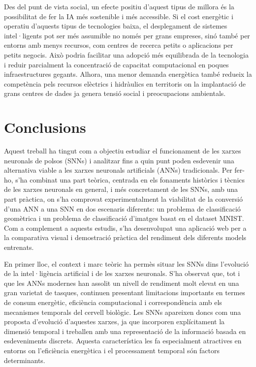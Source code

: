 \documentclass[a4paper,11pt, titlepage, twoside]{article}
\begin{document}
Des del punt de vista social, un efecte positiu d’aquest tipus de millora és la possibilitat de fer la IA més sostenible i més accessible. Si el cost energètic i operatiu d'aquests tipus de tecnologies baixa, el desplegament de sistemes intel·ligents pot ser més assumible no només per grans empreses, sinó també per entorns amb menys recursos, com centres de recerca petits o aplicacions per petits negocis. Això podria facilitar una adopció més equilibrada de la tecnologia i reduir parcialment la concentració de capacitat computacional en poques infraestructures gegants. Alhora, una menor demanda energètica també redueix la competència pels recursos elèctrics i hidràulics en territoris on la implantació de grans centres de dades ja genera tensió social i preocupacions ambientals.
\section{Conclusions}

Aquest treball ha tingut com a objectiu estudiar el funcionament de les xarxes neuronals de polsos (SNNs) i analitzar fins a quin punt poden esdevenir una alternativa viable a les xarxes neuronals artificials (ANNs) tradicionals. Per fer-ho, s'ha combinat una part teòrica, centrada en els fonaments històrics i tècnics de les xarxes neuronals en general, i més concretament de les SNNs, amb una part pràctica, on s'ha comprovat experimentalment la viabilitat de la conversió d'una ANN a una SNN en dos escenaris diferents: un problema de classificació geomètrica i un problema de classificació d'imatges basat en el dataset MNIST. Com a complement a aquests estudis, s'ha desenvolupat una aplicació web per a la comparativa visual i demostració pràctica del rendiment dels diferents models entrenats.

En primer lloc, el context i marc teòric ha permès situar les SNNs dins l’evolució de la intel·ligència artificial i de les xarxes neuronals. S’ha observat que, tot i que les ANNs modernes han assolit un nivell de rendiment molt elevat en una gran varietat de tasques, continuen presentant limitacions importants en termes de consum energètic, eficiència computacional i correspondència amb els mecanismes temporals del cervell biològic. Les SNNs apareixen doncs com una proposta d'evolució d'aquestes xarxes, ja que incorporen explícitament la dimensió temporal i treballen amb una representació de la informació basada en esdeveniments discrets. Aquesta característica les fa especialment atractives en entorns on l’eficiència energètica i el processament temporal són factors determinants.
\end{document}
